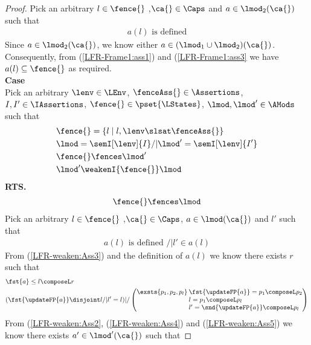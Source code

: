 \begin{lemma}
\begin{proof}
\noindent Pick an arbitrary $l \in \fence{}$ ,$\ca{} \in \Caps$ and $a \in \lmod_2(\ca{})$ such that 
%
\begin{align}
	a(l) \text{ is defined} \label{LFR-Frame1:ass3}
\end{align}
%
Since $a \in \lmod_2(\ca{})$, we know either $a \in (\lmod_1 \cup \lmod_2)(\ca{})$. Consequently, from (\ref{LFR-Frame1:ass1}) and (\ref{LFR-Frame1:ass3} we have $a(l) \subseteq \fence{}$ as required. \\
%
%
%
%
%
%

\noindent\textbf{Case }\\
Pick an arbitrary $\lenv \in \LEnv$, $\fenceAss{} \in \Assertions$, $I, I' \in \IAssertions$, $\fence{} \in \pset{\LStates}$, $\lmod, \lmod' \in \AMods$ such that 
%
\begin{align}
	& \fence{} = \left\{ l \mid l, \lenv \slsat \fenceAss{} \right\} \nonumber\\
	& \lmod = \semI[\lenv]{I} /| \lmod' = \semI[\lenv]{I'} \nonumber\\
	& \fence{} \fences \lmod' \label{LFR-weaken:Ass1}\\
	& \lmod' \weakenI{\fence{}} \lmod \label{LFR-weaken:Ass2}
\end{align}
%
\textbf{RTS. }
\begin{align*}
	\fence{} \fences \lmod
\end{align*}
%
Pick an arbitrary $l \in \fence{}$ ,$\ca{} \in \Caps$, $a \in \lmod(\ca{})$ and $l'$ such that 
%
\begin{align}
	a(l) \text{ is defined } /| l' \in a(l) \label{LFR-weaken:Ass3}
\end{align}
%
From (\ref{LFR-weaken:Ass3}) and the definition of $a(l)$ we know there exists $r$ such that 
%
\begin{align}
	& \fst{a} \leq l \composeL r \label{LFR-weaken:Ass4}\\
	& (\fst{\updateFP{a}} \disjoint l /| l' = l) |/ 
	\left(
	\begin{array}{@{} r @{\hspace{2pt}} l @{}}
		\exsts{p_1, p_2, p_l} & \fst{\updateFP{a}} = p_1 \composeL p_2\\
		& l = p_1 \composeL p_l \\
		& l' = \snd{\updateFP{a}} \composeL p_l
	\end{array}
	\right)
	\label{LFR-weaken:Ass5}
\end{align}
%
From (\ref{LFR-weaken:Ass2}, (\ref{LFR-weaken:Ass4}) and (\ref{LFR-weaken:Ass5}) we know there exists $a' \in \lmod'(\ca{})$ such that 

\end{proof}
\end{lemma}
